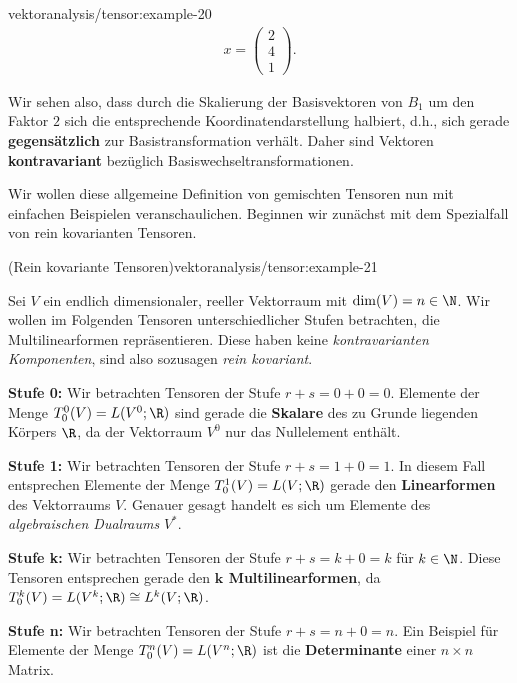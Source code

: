 \documentclass[letterpaper,10pt,english]{jupyterBook}
\begin{document}
\begin{example}{}{vektoranalysis/tensor:example-20}
\begin{align*}
x = \begin{pmatrix}2\\ 4\\ 1\end{pmatrix}.
\end{align*}
\par
Wir sehen also, dass durch die Skalierung der Basisvektoren von \(B_1\) um den Faktor \(2\) sich die entsprechende Koordinatendarstellung halbiert, d.h., sich gerade \textbf{gegensätzlich} zur Basistransformation verhält.
Daher sind Vektoren \textbf{kontravariant} bezüglich Basiswechseltransformationen.
\end{example}

\par
Wir wollen diese allgemeine Definition von gemischten Tensoren nun mit einfachen Beispielen veranschaulichen.
Beginnen wir zunächst mit dem Spezialfall von rein kovarianten Tensoren.
\begin{example}{(Rein kovariante Tensoren)}{vektoranalysis/tensor:example-21}



\par
Sei \(V\) ein endlich dimensionaler, reeller Vektorraum mit \(\operatorname{dim}(V) = n \in \N\).
Wir wollen im Folgenden Tensoren unterschiedlicher Stufen betrachten, die Multilinearformen repräsentieren.
Diese haben keine \emph{kontravarianten Komponenten}, sind also sozusagen \emph{rein kovariant}.

\par
\textbf{Stufe 0:}
Wir betrachten Tensoren der Stufe \(r+s=0+0=0\).
Elemente der Menge \(T^0_0(V) = L(V^0; \R)\) sind gerade die \textbf{Skalare} des zu Grunde liegenden Körpers \(\R\), da der Vektorraum \(V^0\) nur das Nullelement enthält.

\par
\textbf{Stufe 1:}
Wir betrachten Tensoren der Stufe \(r+s=1+0=1\).
In diesem Fall entsprechen Elemente der Menge \(T^1_0(V) = L(V; \R)\) gerade den \textbf{Linearformen} des Vektorraums \(V\).
Genauer gesagt handelt es sich um Elemente des \emph{algebraischen Dualraums} \(V^\ast\).

\par
\textbf{Stufe k:}
Wir betrachten Tensoren der Stufe \(r+s=k+0=k\) für \(k\in \N\).
Diese Tensoren entsprechen gerade den \textbf{\(\mathbf{k}\) Multilinearformen}, da \(T^k_0(V) = L(V^k; \R) \cong L^k(V; \R)\).

\par
\textbf{Stufe n:}
Wir betrachten Tensoren der Stufe \(r+s=n+0=n\).
Ein Beispiel für Elemente der Menge \(T^n_0(V) = L(V^n; \R)\) ist die \textbf{Determinante} einer \(n \times n\) Matrix.
\end{example}
\end{document}

